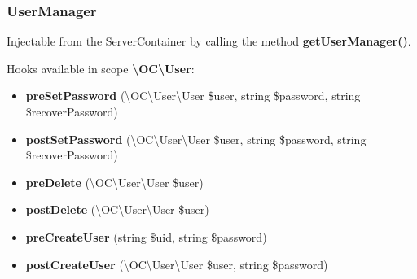 \documentclass[letterpaper,10pt,english]{sphinxmanual}
\begin{document}
\subsubsection{UserManager}
\label{app/hooks:usermanager}
Injectable from the ServerContainer by calling the method \textbf{getUserManager()}.

Hooks available in scope \textbf{\textbackslash{}OC\textbackslash{}User}:
\begin{itemize}
\item {} 
\textbf{preSetPassword} (\textbackslash{}OC\textbackslash{}User\textbackslash{}User \$user, string \$password, string \$recoverPassword)

\item {} 
\textbf{postSetPassword} (\textbackslash{}OC\textbackslash{}User\textbackslash{}User \$user, string \$password, string \$recoverPassword)

\item {} 
\textbf{preDelete} (\textbackslash{}OC\textbackslash{}User\textbackslash{}User \$user)

\item {} 
\textbf{postDelete} (\textbackslash{}OC\textbackslash{}User\textbackslash{}User \$user)

\item {} 
\textbf{preCreateUser} (string \$uid, string \$password)

\item {} 
\textbf{postCreateUser} (\textbackslash{}OC\textbackslash{}User\textbackslash{}User \$user, string \$password)

\end{itemize}
\end{document}
